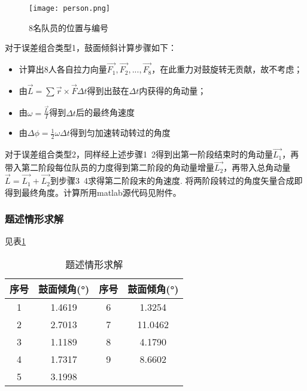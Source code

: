 \documentclass[withoutpreface,bwprint]{cumcmthesis} %
\begin{document}
\begin{figure}[h]
	\centering
	\texttt{[image: person.png]}
	\caption{8名队员的位置与编号}
	\label{fig:per}
\end{figure}

对于误差组合类型1，鼓面倾斜计算步骤如下：
\begin{itemize}
	\item 计算出8人各自拉力向量$\overrightarrow{F_1},\overrightarrow{F_2},...,\overrightarrow{F_8}$，在此重力对鼓旋转无贡献，故不考虑；
	\item 由$\overrightarrow{L}=\sum \overrightarrow{r}\times \overrightarrow{F}\Delta t$得到出鼓在$\Delta t$内获得的角动量；
	\item 由$\omega=\frac{\overrightarrow{L}}{I}$得到$\Delta t$后的最终角速度
	\item 由$\Delta \phi=\frac{1}{2}\omega \Delta t$得到匀加速转动转过的角度
\end{itemize}
对于误差组合类型2，同样经上述步骤1~2得到出第一阶段结束时的角动量$\overrightarrow{L_1}$，再带入第二阶段每位队员的力度得到第二阶段的角动量增量$\overrightarrow{L_2}$，再带入总角动量$\overrightarrow{L}=\overrightarrow{L_1}+\overrightarrow{L_2}$到步骤3~4求得第二阶段末的角速度. 将两阶段转过的角度矢量合成即得到最终角度。计算所用matlab源代码见附件。

\subsubsection{题述情形求解}
见表\ref{cli}

\begin{table}[h]
	\centering
\begin{tabular}{|c|c|c|c|}%
	\hline  %
	序号 & 鼓面倾角(°) & 序号 & 鼓面倾角(°)\\
	\hline  %
	1 & 1.4619 & 6 & 1.3254 \\
	\hline  %
	2 & 2.7013 & 7 & 11.0462 \\
	\hline  %
	3 & 1.1189 & 8 & 4.1790 \\
	\hline  %
	4 & 1.7317 & 9 & 8.6602\\
	\hline  %
	5 & 3.1998 & & \\
	\hline %
\end{tabular}
\caption{题述情形求解}
\label{cli}
\end{table}
\end{document}
